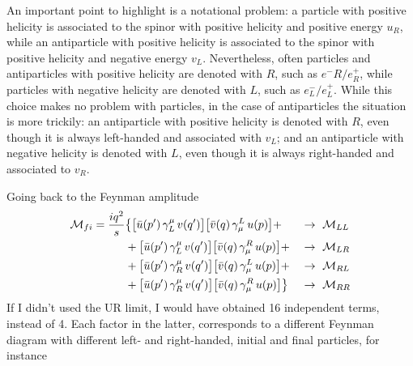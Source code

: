 \documentclass[TheoreticalPhy_ModB.tex]{subfiles}
\begin{document}
An important point to highlight is a notational problem: a particle with positive helicity is associated to the spinor with positive helicity and positive energy $u_R$, while an antiparticle with positive helicity is associated to the spinor with positive helicity and negative energy $v_L$. Nevertheless, often particles and antiparticles with positive helicity are denoted with $R$, such as $e^-R/e^+_R$, while particles with negative helicity are denoted with $L$, such as $e^-_L/e^+_L$. While this choice makes no problem with particles, in the case of antiparticles the situation is more trickily: an antiparticle with positive helicity is denoted with $R$, even though it is always left-handed and associated with $v_L$; and an antiparticle with negative helicity is denoted with $L$, even though it is always right-handed and associated to $v_R$. 

Going back to the Feynman amplitude
\[\begin{aligned}
\mathM_{fi} = \frac{iq^2}{s}	
	& \big\{		\bigl[ \bar{u}(p') \, \gamma^{\mu}_L \, v(q') \bigr] \bigl[ \bar{v}(q) \, \gamma_{\mu}^L \, u(p) \bigr] + &&\to \ \mathM_{LL}\\
	& + 	\bigl[ \bar{u}(p') \, \gamma^{\mu}_L \, v(q') \bigr] \bigl[ \bar{v}(q) \, \gamma_{\mu}^R \, u(p) \bigl] + && \to\  \mathM_{LR}\\
	& + 	\bigl[ \bar{u}(p') \, \gamma^{\mu}_R \, v(q') \bigr] \bigl[ \bar{v}(q) \, \gamma_{\mu}^L \, u(p) \bigr] + && \to \ \mathM_{RL}\\
	& + 	\bigl[ \bar{u}(p') \, \gamma^{\mu}_R \, v(q') \bigr] \bigl[ \bar{v}(q) \, \gamma_{\mu}^R \, u(p) \bigr] \big\}  && \to\  \mathM_{RR}
\end{aligned}\]
If I didn't used the UR limit, I would have obtained 16 independent terms, instead of 4.
Each factor in the latter, corresponds to a different Feynman diagram with different left- and right-handed, initial and final particles, for instance
\end{document}
